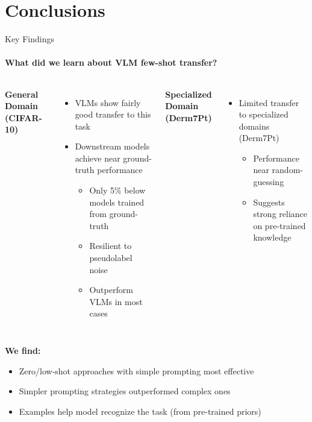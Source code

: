 \section{Conclusions}
\begin{frame}{Key Findings}
\framesubtitle{What did we learn about VLM few-shot transfer?}
  \vspace{-0.4em}
  \begin{columns}[T]
    \column{\customcolumnwidth}
      \textbf{General Domain (CIFAR-10)}
      \vspace{-0.2em}
      \begin{itemize}
        \item VLMs show fairly good transfer to this task
        \item Downstream models achieve near ground-truth performance
        \begin{itemize}
          \item Only 5\% below models trained from ground-truth
          \item Resilient to pseudolabel noise
          \item Outperform VLMs in most cases
        \end{itemize}
      \end{itemize}
    \column{\customcolumnwidth}
      \textbf{Specialized Domain (Derm7Pt)}
      \vspace{-0.2em}
      \begin{itemize}
        \item Limited transfer to specialized domains (Derm7Pt)
        \begin{itemize}
          \item Performance near random-guessing
          \item Suggests strong reliance on pre-trained knowledge
        \end{itemize}
      \end{itemize}
  \end{columns}
  \textbf{We find:}
  \begin{itemize}
    \item Zero/low-shot approaches with simple prompting most effective
    \item Simpler prompting strategies outperformed complex ones
    \item Examples help model recognize the task (from pre-trained priors)~
  \end{itemize}
  \vspace{-0.4em}
  \blfootnote{\vspace{0.05em}}
\end{frame}
